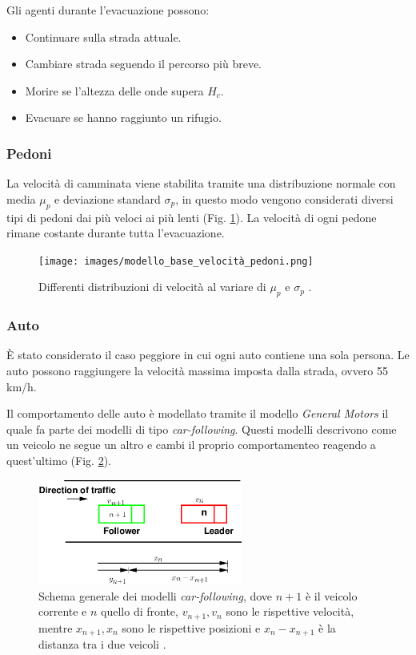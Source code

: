 \vspace*{4mm}

\noindent
Gli agenti durante l'evacuazione possono:
\begin{itemize}
  \item Continuare sulla strada attuale.
  \item Cambiare strada seguendo il percorso più breve.
  \item Morire se l'altezza delle onde supera $H_c$.
  \item Evacuare se hanno raggiunto un rifugio.
\end{itemize}

\subsubsection{Pedoni}
La velocità di camminata viene stabilita tramite una distribuzione normale
con media $\mu_p$ e deviazione standard $\sigma_p$, in questo modo vengono considerati diversi
 tipi di pedoni dai più veloci ai più lenti (Fig. \ref{fig:modello-base-velocita-pedoni-img}).
La velocità di ogni pedone rimane costante durante tutta l'evacuazione.

\begin{figure}[ht]
  \centering
  \texttt{[image: images/modello\_base\_velocità\_pedoni.png]}
  \caption{Differenti distribuzioni di velocità al variare di $\mu_p$ e $\sigma_p$ \parencite{mostafizi2016agent}.}
  \label{fig:modello-base-velocita-pedoni-img}
\end{figure}

\subsubsection{Auto}
È stato considerato il caso peggiore in cui ogni auto contiene una sola persona.
Le auto possono raggiungere la velocità massima imposta dalla strada, ovvero 55 km/h.

Il comportamento delle auto è modellato tramite il modello \textit{General Motors} il quale fa parte dei modelli
di tipo \textit{car-following}. Questi modelli descrivono come un veicolo ne segue un altro
e cambi il proprio comportamenteo reagendo a quest'ultimo (Fig. \ref{fig:general-motors-img}).

\begin{figure}[ht]
  \centering
  \includegraphics[width=0.6\textwidth]{images/GM.png}
  \caption{Schema generale dei modelli \textit{car-following}, dove $n+1$ è il veicolo corrente e $n$ quello di fronte, 
  $v_{n+1}, v_{n}$ sono le rispettive velocità, mentre $x_{n+1}, x_{n}$ sono le rispettive posizioni e $x_{n} - x_{n + 1}$ è la distanza tra i due veicoli \parencite{carfollowing}.}
  \label{fig:general-motors-img}
\end{figure}


